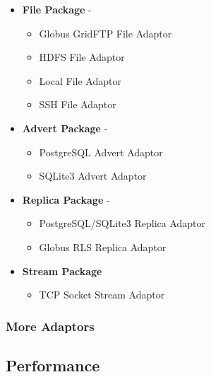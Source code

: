     \begin{itemize}
    
    \item \textbf{File Package} - 
    
    \begin{itemize}
    \item Globus GridFTP File Adaptor
    \item HDFS File Adaptor
    \item Local File Adaptor
    \item SSH File Adaptor
    
    \end{itemize}
    
    \item \textbf{Advert Package} - 
    
    \begin{itemize}
    \item PostgreSQL Advert Adaptor
    \item SQLite3 Advert Adaptor
    \end{itemize}
    
    \item \textbf{Replica Package} - 
    
    \begin{itemize}
    \item PostgreSQL/SQLite3 Replica Adaptor
    \item Globus RLS Replica Adaptor
    \end{itemize}
    
    \item \textbf{Stream Package}
    
    \begin{itemize}
    \item TCP Socket Stream Adaptor
    \end{itemize}
    
    \end{itemize}
 

   \subsubsection{More Adaptors}


  \subsection{Performance}
  
